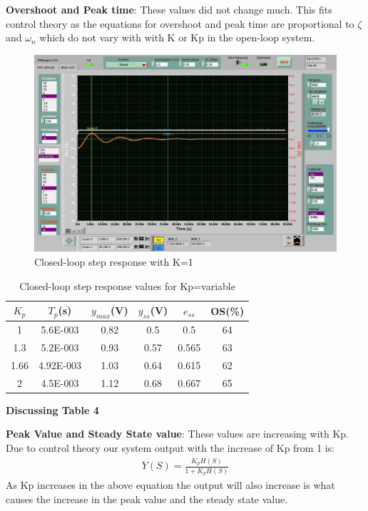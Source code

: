 \documentclass{article}
\begin{document}
\textbf{Overshoot and Peak time}: These values did not change much. This fits control theory as the equations for overshoot and peak time are proportional to $\zeta$ and $\omega_n$ which do not vary with with K or Kp in the open-loop system.

\begin{figure}[!htbp]
\centering
\includegraphics[width=7in]{4_2b.jpg}
\caption{Closed-loop step response with K=1}
\end{figure}
\begin{table}[!htbp]
\centering
    \begin{tabular}{|c|c|c|c|c|c|}
        \hline
        $K_p$ & $T_p$(s) & $y_{max}$(V) & $y_{ss}$(V) & $e_{ss}$ & OS(\%)\\
        \hline
        1 & 5.6E-003 & 0.82 & 0.5 & 0.5 & 64\\
        \hline
        1.3 & 5.2E-003 & 0.93 & 0.57 & 0.565 & 63\\
        \hline
        1.66 & 4.92E-003 & 1.03 & 0.64 & 0.615 & 62\\
        \hline
        2 & 4.5E-003 & 1.12 & 0.68 & 0.667 & 65\\
        \hline
    \end{tabular}
    \caption{Closed-loop step response values for Kp=variable}
\end{table}

\textbf{Discussing Table 4}

\textbf{Peak Value and Steady State value}: These values are increasing with Kp. Due to control theory our system output with the increase of Kp from 1 is:
\begin{align*}
      Y(S) = \frac{K_pH(S)}{1 + K_pH(S)}
  \end{align*}
As Kp increases in the above equation the output will also increase is what causes the increase in the peak value and the steady state value.
\end{document}
